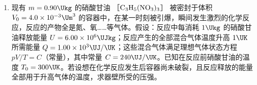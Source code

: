 \documentclass[\gkver]{gaokaozhenti}
\begin{document}
\begin{enumerate}
\begin{enumerate}
	\item
	在图上画出该束光线射入水珠内经一次反射后又从水珠中射出的光路图；
	\item
	求这束光线从射向水珠到射出水珠每一次偏转的角度。
\end{enumerate}




\item
现有 $m=0.90\Ukg$ 的硝酸甘油 ［$\ce{C3H5(NO3)3}$］ 被密封于体积 $V_{0}=4.0\times10^{-3}\Um^{3}$ 的容器中，在某一时刻被引爆，瞬间发生激烈的化学反应，反应的产物全是氮、氧……等气体。假设：反应中每消耗 $1\Ukg$ 的硝酸甘油释放能量 $U=6.00\times10^{6}\UJkg$；反应产生的全部混合气体温度升高 $1\UK$ 所需能量 $Q=1.00\times10^{3}\UJ/\UK$；这些混合气体满足理想气体状态方程 $pV/T=C$（常量），其中常量 $C=240\UJ/\UK$。已知在反应前硝酸甘油的温度 $T_{0}=300\UK$。若设想在化学反应发生后容器尚未破裂，且反应释放的能量全部用于升高气体的温度，求器壁所受的压强。


\end{enumerate}
\end{document}
